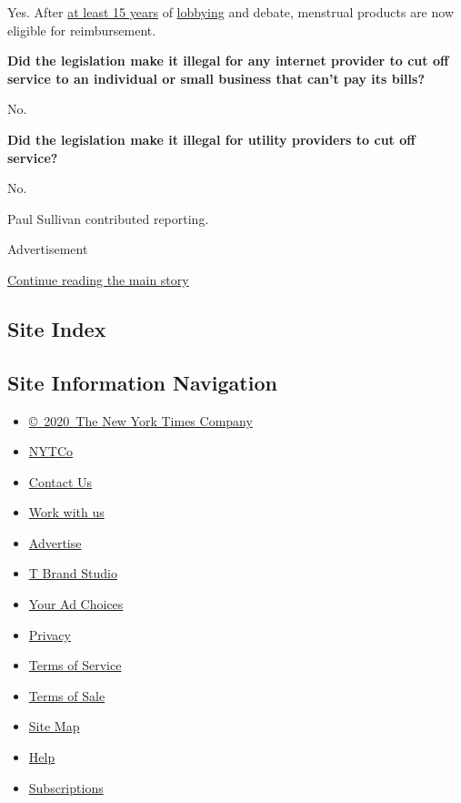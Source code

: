 Yes. After \href{https://www.wsj.com/articles/SB106556104757114900}{at
least 15 years} of
\href{https://www.periodequity.org/mission-and-history}{lobbying} and
debate, menstrual products are now eligible for reimbursement.

\textbf{Did the legislation make it illegal for any internet provider to
cut off service to an individual or small business that can't pay its
bills?}

No.

\textbf{Did the legislation make it illegal for utility providers to cut
off service?}

No.

Paul Sullivan contributed reporting.

Advertisement

\protect\hyperlink{after-bottom}{Continue reading the main story}

\hypertarget{site-index}{%
\subsection{Site Index}\label{site-index}}

\hypertarget{site-information-navigation}{%
\subsection{Site Information
Navigation}\label{site-information-navigation}}

\begin{itemize}
\tightlist
\item
  \href{https://help.nytimes.com/hc/en-us/articles/115014792127-Copyright-notice}{©~2020~The
  New York Times Company}
\end{itemize}

\begin{itemize}
\tightlist
\item
  \href{https://www.nytco.com/}{NYTCo}
\item
  \href{https://help.nytimes.com/hc/en-us/articles/115015385887-Contact-Us}{Contact
  Us}
\item
  \href{https://www.nytco.com/careers/}{Work with us}
\item
  \href{https://nytmediakit.com/}{Advertise}
\item
  \href{http://www.tbrandstudio.com/}{T Brand Studio}
\item
  \href{https://www.nytimes.com/privacy/cookie-policy\#how-do-i-manage-trackers}{Your
  Ad Choices}
\item
  \href{https://www.nytimes.com/privacy}{Privacy}
\item
  \href{https://help.nytimes.com/hc/en-us/articles/115014893428-Terms-of-service}{Terms
  of Service}
\item
  \href{https://help.nytimes.com/hc/en-us/articles/115014893968-Terms-of-sale}{Terms
  of Sale}
\item
  \href{https://spiderbites.nytimes.com}{Site Map}
\item
  \href{https://help.nytimes.com/hc/en-us}{Help}
\item
  \href{https://www.nytimes.com/subscription?campaignId=37WXW}{Subscriptions}
\end{itemize}
